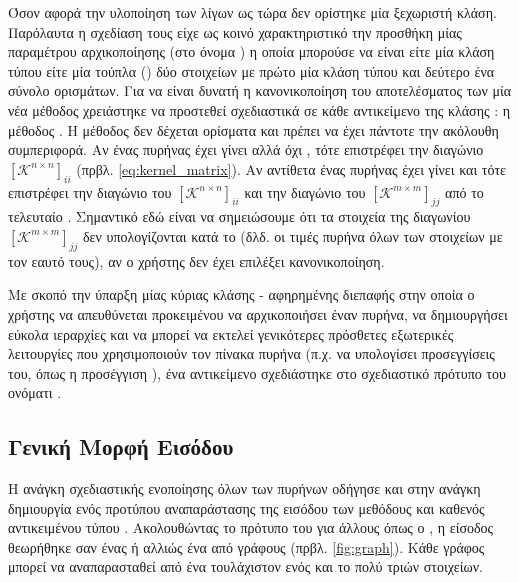 Όσον αφορά την υλοποίηση των λίγων ως τώρα  δεν ορίστηκε μία ξεχωριστή κλάση.
Παρόλαυτα η σχεδίαση τους είχε ως κοινό χαρακτηριστικό την προσθήκη μίας παραμέτρου αρχικοποίησης (στο όνομα ) η οποία μπορούσε να είναι είτε μία κλάση τύπου  είτε μία τούπλα () δύο στοιχείων με πρώτο μία κλάση τύπου  και δεύτερο ένα σύνολο ορισμάτων.
Για να είναι δυνατή η κανονικοποίηση του αποτελέσματος των  μία νέα μέθοδος χρειάστηκε να προστεθεί σχεδιαστικά σε κάθε αντικείμενο της κλάσης : η μέθοδος .
Η μέθοδος δεν δέχεται ορίσματα και πρέπει να έχει πάντοτε την ακόλουθη συμπεριφορά. Αν ένας πυρήνας έχει γίνει  αλλά όχι , τότε επιστρέφει την διαγώνιο $[\mathcal{K}^{n\times n}]_{ii}$ (πρβλ. \ref{eq:kernel_matrix}).
Αν αντίθετα ένας πυρήνας έχει γίνει  και  τότε επιστρέφει την διαγώνιο του $[\mathcal{K}^{n\times n}]_{ii}$ και την διαγώνιο του $[\mathcal{K}^{m\times m}]_{jj}$ από το τελευταίο .
Σημαντικό εδώ είναι να σημειώσουμε ότι τα στοιχεία της διαγωνίου $[\mathcal{K}^{m\times m}]_{jj}$ δεν υπολογίζονται κατά το  (δλδ. οι τιμές πυρήνα όλων των στοιχείων με τον εαυτό τους), αν ο χρήστης δεν έχει επιλέξει κανονικοποίηση.

Με σκοπό την ύπαρξη μίας κύριας κλάσης - αφηρημένης διεπαφής στην οποία ο χρήστης να απευθύνεται προκειμένου να αρχικοποιήσει έναν πυρήνα, να δημιουργήσει εύκολα ιεραρχίες  και να μπορεί να εκτελεί γενικότερες πρόσθετες εξωτερικές λειτουργίες που χρησιμοποιούν τον πίνακα πυρήνα (π.χ. να υπολογίσει προσεγγίσεις του, όπως η προσέγγιση ), ένα αντικείμενο σχεδιάστηκε στο σχεδιαστικό πρότυπο του  ονόματι \texttt{}.

\subsection{Γενική Μορφή Εισόδου}
Η ανάγκη σχεδιαστικής ενοποίησης όλων των πυρήνων οδήγησε και στην ανάγκη δημιουργία ενός προτύπου αναπαράστασης της εισόδου των μεθόδους  και  καθενός αντικειμένου τύπου .
Ακολουθώντας το πρότυπο του  για άλλους  όπως ο , η είσοδος θεωρήθηκε σαν ένας \textit{} ή αλλιώς ένα  από γράφους (πρβλ. \ref{fig:graph}).
Κάθε γράφος μπορεί να αναπαρασταθεί από ένα  τουλάχιστον ενός και το πολύ τριών στοιχείων.


